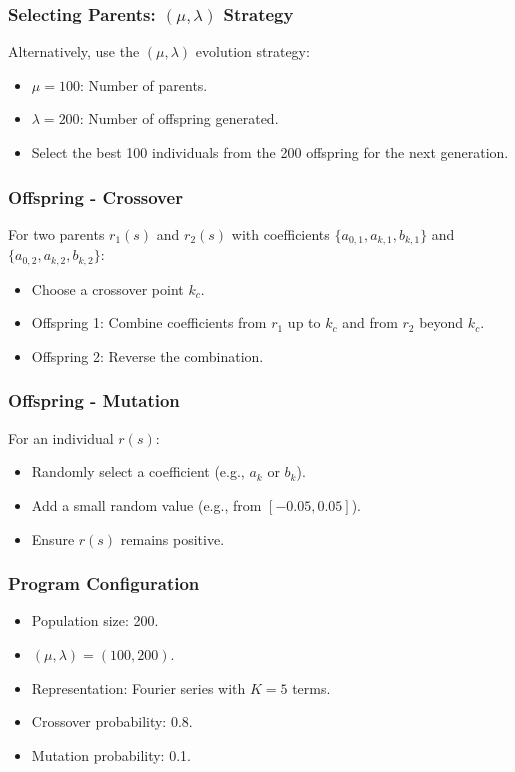 \documentclass{beamer}
\begin{document}
\begin{frame}
    \frametitle{Selecting Parents: \( (\mu, \lambda) \) Strategy}
    Alternatively, use the \( (\mu, \lambda) \) evolution strategy:
    \begin{itemize}
        \item \( \mu = 100 \): Number of parents.
        \item \( \lambda = 200 \): Number of offspring generated.
        \item Select the best 100 individuals from the 200 offspring for the next generation.
    \end{itemize}
\end{frame}

\begin{frame}
    \frametitle{Offspring - Crossover}
    For two parents \( r_1(s) \) and \( r_2(s) \) with coefficients \( \{a_{0,1}, a_{k,1}, b_{k,1}\} \) and \( \{a_{0,2}, a_{k,2}, b_{k,2}\} \):
    \begin{itemize}
        \item Choose a crossover point \( k_c \).
        \item Offspring 1: Combine coefficients from \( r_1 \) up to \( k_c \) and from \( r_2 \) beyond \( k_c \).
        \item Offspring 2: Reverse the combination.
    \end{itemize}
\end{frame}

\begin{frame}
    \frametitle{Offspring - Mutation}
    For an individual \( r(s) \):
    \begin{itemize}
        \item Randomly select a coefficient (e.g., \( a_k \) or \( b_k \)).
        \item Add a small random value (e.g., from \( [-0.05, 0.05] \)).
        \item Ensure \( r(s) \) remains positive.
    \end{itemize}
\end{frame}

\begin{frame}
    \frametitle{Program Configuration}
    \begin{itemize}
        \item Population size: 200.
        \item \( (\mu, \lambda) = (100, 200) \).
        \item Representation: Fourier series with \( K = 5 \) terms.
        \item Crossover probability: 0.8.
        \item Mutation probability: 0.1.
    \end{itemize}
\end{frame}
\end{document}
